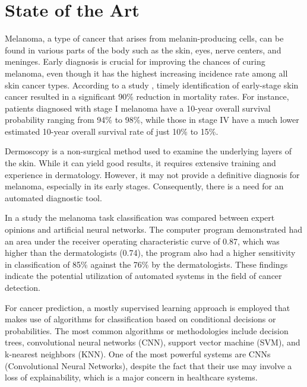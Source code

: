 \chapter{State of the Art}
\label{cap:estat}

Melanoma, a type of cancer that arises from melanin-producing cells, can be
found in various parts of the body such as the skin, eyes, nerve centers, and
meninges. Early diagnosis is crucial for improving the chances of curing
melanoma, even though it has the highest increasing incidence rate among all
skin cancer types. According to a study \cite{TimelyMelanomaDetection}, timely
identification of early-stage skin cancer resulted in a significant 90\%
reduction in mortality rates. For instance, patients diagnosed with stage I
melanoma have a 10-year overall survival probability ranging from 94\% to 98\%,
while those in stage IV have a much lower estimated 10-year overall survival
rate of just 10\% to 15\%. \newline

Dermoscopy is a non-surgical method used to examine the underlying layers of
the skin. While it can yield good results, it requires extensive training and
experience in dermatology. However, it may not provide a definitive diagnosis
for melanoma, especially in its early stages. Consequently, there is a need for
an automated diagnostic tool. \newline

In a study \cite{EpidemiologySkinCancer} the melanoma task classification was
compared between expert opinions and artificial neural networks. The computer
program demonstrated had an area under the receiver operating characteristic
curve of 0.87, which was higher than the dermatologists (0.74), the program
also had a higher sensitivity in classification of 85\% against the 76\% by the
dermatologists. These findings indicate the potential utilization of automated
systems in the field of cancer detection. \newline

For cancer prediction, a mostly supervised learning approach is employed that
makes use of algorithms for classification based on conditional decisions or
probabilities. The most common algorithms or methodologies include decision
trees, convolutional neural networks (CNN), support vector machine (SVM), and
k-nearest neighbors (KNN). One of the most powerful systems are CNNs
(Convolutional Neural Networks), despite the fact that their use may involve a
loss of explainability, which is a major concern in healthcare systems.
\newline

